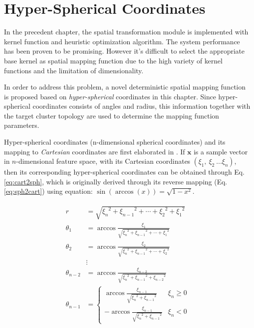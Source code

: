 \section{Hyper-Spherical Coordinates}

In the precedent chapter, the spatial transformation module is implemented with kernel function and heuristic optimization algorithm. The system performance has been proven to be promising. However it's difficult to select the appropriate base kernel as spatial mapping function due to the high variety of kernel functions and the limitation of dimensionality.

In order to address this problem, a novel deterministic spatial mapping function is proposed based on \textit{hyper-spherical} coordinates in this chapter. Since hyper-spherical coordinates consists of angles and radius, this information together with the target cluster topology are used to determine the mapping function parameters.


Hyper-spherical coordinates (n-dimensional spherical coordinates) and its mapping to \textit{Cartesian} coordinates are first elaborated in \cite{nsphere}. If $\mathbf{x}$ is a sample vector in 
$n$-dimensional feature space, with its Cartesian coordinates $(\xi_1,~\xi_2~... \xi_n)$, then its corresponding hyper-spherical coordinates can be obtained through Eq.\ref{eq:cart2sph}, which is originally derived through its reverse mapping (Eq.\ref{eq:sph2cart}) using equation: $\sin(\arccos(x)) = \sqrt{1-x^2}$.



\begin{align}
\label{eq:cart2sph}
\begin{aligned}
r      &= \sqrt{{\xi_n}^2 + {\xi_{n-1}}^2 + \cdots + {\xi_2}^2 + {\xi_1}^2} \\
\theta_1 &= \arccos \frac{\xi_{1}}{\sqrt{{\xi_n}^2+{\xi_{n-1}}^2+\cdots+{\xi_1}^2}} \\
 \theta_2 &= \arccos \frac{\xi_{2}}{\sqrt{{\xi_n}^2+{\xi_{n-1}}^2+\cdots+{\xi_2}^2}} \\
        &\vdots\\
 \theta_{n-2} &=\arccos \frac{\xi_{n-2}}{\sqrt{{\xi_n}^2+{\xi_{n-1}}^2+{\xi_{n-2}}^2}} \\
 \theta_{n-1} &= 
 \begin{cases}
     \arccos \frac{\xi_{n-1}}{\sqrt{{\xi_n}^2+{\xi_{n-1}}^2}} & \xi_n\geq 0 \\
     - \arccos \frac{\xi_{n-1}}{\sqrt{{\xi_n}^2+{\xi_{n-1}}^2}} & \xi_n < 0
 \end{cases} 
 \end{aligned}
\end{align}


